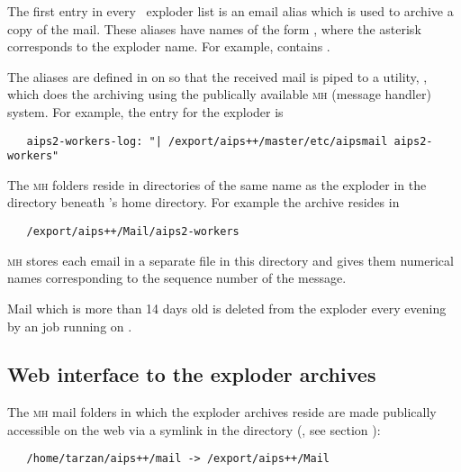 The first entry in every \aipspp\ exploder list is an email alias which is
used to archive a copy of the mail.  These aliases have names of the form
, where the asterisk corresponds to the exploder name.  For
example, \mbox{} contains
\mbox{}.

The  aliases are defined in  on
 so that the received mail is piped to a utility,
, which does the archiving using the publically available
\textsc{mh} (message handler) system.  For example, the entry for the
\mbox{} exploder is

\begin{verbatim}
   aips2-workers-log: "| /export/aips++/master/etc/aipsmail aips2-workers"
\end{verbatim}

\noindent
The \textsc{mh} folders reside in directories of the same name as the exploder
in the  directory beneath 's home directory.  For
example the \mbox{} archive resides in

\begin{verbatim}
   /export/aips++/Mail/aips2-workers
\end{verbatim}

\noindent
\textsc{mh} stores each email in a separate file in this directory and gives
them numerical names corresponding to the sequence number of the message.

Mail which is more than 14 days old is deleted from the
\mbox{} exploder every evening by an 
 job running on .

\subsection*{Web interface to the exploder archives}

The \textsc{mh} mail folders in which the exploder archives reside are made
publically accessible on the web via a symlink in the 
 directory (, see section
):

\begin{verbatim}
   /home/tarzan/aips++/mail -> /export/aips++/Mail
\end{verbatim}

